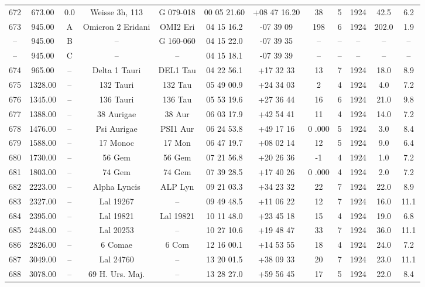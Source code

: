 \begin{table}
\begin{tabular}{cccccccccccc}
672 & 673.00 & 0.0 & Weisse 3h, 113 & G 079-018 & 00 05 21.60 & +08 47 16.20 & 38 & 5 & 1924 & 42.5 & 6.2 \\
673 & 945.00 & A & Omicron 2 Eridani & OMI2 Eri & 04 15 16.2 & -07 39 09 & 198 & 6 & 1924 & 202.0 & 1.9 \\
-- & 945.00 & B & -- & G 160-060 & 04 15 22.0 & -07 39 35 & -- & -- & -- & -- & -- \\
-- & 945.00 & C & -- & -- & 04 15 18.1 & -07 39 39 & -- & -- & -- & -- & -- \\
674 & 965.00 & -- & Delta 1 Tauri & DEL1 Tau & 04 22 56.1 & +17 32 33 & 13 & 7 & 1924 & 18.0 & 8.9 \\
675 & 1328.00 & -- & 132 Tauri & 132 Tau & 05 49 00.9 & +24 34 03 & 2 & 4 & 1924 & 4.0 & 7.2 \\
676 & 1345.00 & -- & 136 Tauri & 136 Tau & 05 53 19.6 & +27 36 44 & 16 & 6 & 1924 & 21.0 & 9.8 \\
677 & 1388.00 & -- & 38 Aurigae & 38 Aur & 06 03 17.9 & +42 54 41 & 11 & 4 & 1924 & 14.0 & 7.2 \\
678 & 1476.00 & -- & Psi Aurigae & PSI1 Aur & 06 24 53.8 & +49 17 16 & 0 .000 & 5 & 1924 & 3.0 & 8.4 \\
679 & 1588.00 & -- & 17 Monoc & 17 Mon & 06 47 19.7 & +08 02 14 & 12 & 5 & 1924 & 9.0 & 6.4 \\
680 & 1730.00 & -- & 56 Gem & 56 Gem & 07 21 56.8 & +20 26 36 & -1 & 4 & 1924 & 1.0 & 7.2 \\
681 & 1803.00 & -- & 74 Gem & 74 Gem & 07 39 28.5 & +17 40 26 & 0 .000 & 4 & 1924 & 2.0 & 7.2 \\
682 & 2223.00 & -- & Alpha Lyncis & ALP Lyn & 09 21 03.3 & +34 23 32 & 22 & 7 & 1924 & 22.0 & 8.9 \\
683 & 2327.00 & -- & Lal 19267 & -- & 09 49 48.5 & +11 06 22 & 12 & 7 & 1924 & 16.0 & 11.1 \\
684 & 2395.00 & -- & Lal 19821 & Lal 19821 & 10 11 48.0 & +23 45 18 & 15 & 4 & 1924 & 19.0 & 6.8 \\
685 & 2448.00 & -- & Lal 20253 & -- & 10 27 10.6 & +19 48 47 & 33 & 7 & 1924 & 36.0 & 11.1 \\
686 & 2826.00 & -- & 6 Comae & 6 Com & 12 16 00.1 & +14 53 55 & 18 & 4 & 1924 & 24.0 & 7.2 \\
687 & 3049.00 & -- & Lal 24760 & -- & 13 20 01.5 & +38 09 33 & 20 & 7 & 1924 & 23.0 & 11.1 \\
688 & 3078.00 & -- & 69 H. Urs. Maj. & -- & 13 28 27.0 & +59 56 45 & 17 & 5 & 1924 & 22.0 & 8.4 \\

\end{tabular}
\end{table}
